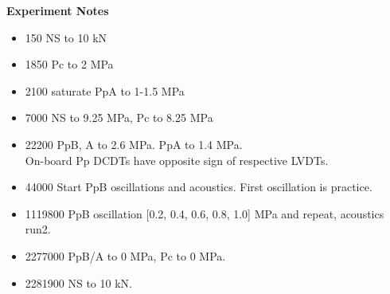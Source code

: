 \documentclass[letterpaper, 10pt]{article}
\begin{document}
\newpage 
 \textbf{Experiment Notes}
 \medskip
 {\small \begin{itemize}[label=\#]
 \setlength\itemsep{0.25em}
 	 \item 150 NS to 10 kN
 	 \item 1850 Pc to 2 MPa
 	 \item 2100 saturate PpA to 1-1.5 MPa
 	 \item 7000 NS to 9.25 MPa, Pc to 8.25 MPa
 	 \item 22200 PpB, A to 2.6 MPa. PpA to 1.4 MPa. \\On-board Pp DCDTs have opposite sign of respective LVDTs.
 	 \item 44000 Start PpB oscillations and acoustics. First oscillation is practice.
 	 \item 1119800 PpB oscillation [0.2, 0.4, 0.6, 0.8, 1.0] MPa and repeat, acoustics run2. 
 	 \item 2277000 PpB/A to 0 MPa, Pc to 0 MPa.
 	 \item 2281900 NS to 10 kN.
 \end{itemize}} 

 
\end{document}

